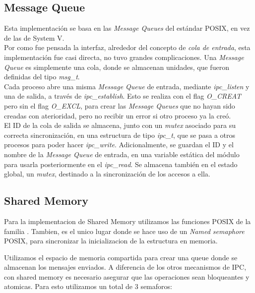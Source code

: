 \documentclass[a4paper,10pt]{article}
\begin{document}
\subsection{Message Queue}

Esta implementación se basa en las \textit{Message Queues} del estándar POSIX, en vez de las de System V.\\

Por como fue pensada la interfaz, alrededor del concepto de \textit{cola de entrada}, esta implementación fue casi directa, no tuvo grandes complicaciones.
Una \textit{Message Queue} es simplemente una cola, donde se almacenan unidades, que fueron definidas del tipo \textit{msg\_t}.\\

Cada proceso abre una misma \textit{Message Queue} de entrada, mediante \textit{ipc\_listen} y una de salida, a través de \textit{ipc\_establish}. Esto se realiza 
con el flag \textit{O\_CREAT} pero sin el flag \textit{O\_EXCL}, para crear las \textit{Message Queues} que no hayan sido creadas con aterioridad, pero no recibir 
un error si otro proceso ya la creó.\\

El ID de la cola de salida se almacena, junto con un \textit{mutex} asociado para su correcta sincronización, en una estructura de tipo \textit{ipc\_t}, que se 
pasa a otros procesos para poder hacer \textit{ipc\_write}. Adicionalmente, se guardan el ID y el nombre de la \textit{Message Queue} de entrada, en una 
variable estática del módulo para usarla posteriormente en el \textit{ipc\_read}. Se almacena también en el estado global, un \textit{mutex}, destinado a la 
sincronización de los accesos a ella.\\

\subsection{Shared Memory}
Para la implementacion de Shared Memory utilizamos las funciones POSIX de la familia .
Tambien, es el unico lugar donde se hace uso de un \textit{Named semaphore} POSIX, para sincronizar la inicializacion de la estructura en memoria.

Utilizamos el espacio de memoria compartida para crear una queue donde se almacenan los mensajes enviados.
A diferencia de los otros mecanismos de IPC, con shared memory es necesario asegurar que las operaciones sean bloqueantes y atomicas.
Para esto utilizamos un total de 3 semaforos:
\end{document}
